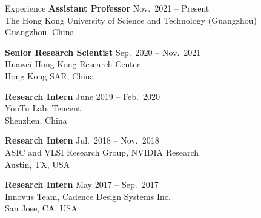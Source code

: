 
\begin{rSection}{Experience}
{\bf Assistant Professor}         \hfill { Nov.~2021 -- Present} \\
The Hong Kong University of Science and Technology (Guangzhou) \\
Guangzhou, China

{\bf Senior Research Scientist}         \hfill { Sep.~2020 -- Nov.~2021} \\
Huawei Hong Kong Research Center\\
Hong Kong SAR, China

{\bf Research Intern}         \hfill { June 2019 -- Feb.~2020} \\
YouTu Lab, Tencent\\
Shenzhen, China

{\bf Research Intern}               \hfill { Jul.~2018 -- Nov.~2018} \\
ASIC and VLSI Research Group, NVIDIA Research\\
Austin, TX, USA

{\bf Research Intern}               \hfill { May 2017 -- Sep.~2017} \\
Innovus Team, Cadence Design Systems Inc.\\
San Jose, CA, USA


\end{rSection}


